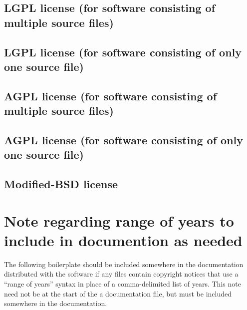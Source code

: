 \documentclass[10pt,a4paper]{article}
\begin{document}
\subsection{LGPL license (for software consisting of multiple source files)}
\begin{boilerplate}

\end{boilerplate}

\subsection{LGPL license (for software consisting of only one source file)}
\begin{boilerplate}

\end{boilerplate}

\subsection{AGPL license (for software consisting of multiple source files)}
\begin{boilerplate}

\end{boilerplate}

\subsection{AGPL license (for software consisting of only one source file)}
\begin{boilerplate}

\end{boilerplate}

\subsection{Modified-BSD license}
\begin{boilerplate}

\end{boilerplate}



\section{Note regarding range of years to include in documention as needed}
\label{appendix:range.of.years}
The following boilerplate should be included somewhere in the 
documentation distributed with the software if any files contain copyright 
notices that use a ``range of years'' syntax in place of a comma-delimited 
list of years. This note need not be at the start of the a documentation file, 
but must be included somewhere in the documentation. 
\end{document}

